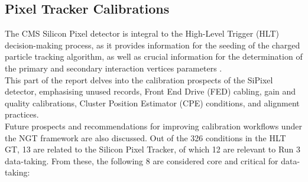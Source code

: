 \subsection{Pixel Tracker Calibrations}\label{sec:PixelCalib}

The CMS Silicon Pixel detector is integral to the High-Level Trigger (HLT) decision-making process, as it provides information for the seeding of the charged particle tracking algorithm, as well as crucial information for the determination of the primary and secondary interaction vertices parameters \cite{CMS:2012sda,CMSTrackerGroup:2020edz}.\\
This part of the report delves into the calibration prospects of the SiPixel detector, emphasising unused records, Front End Drive (FED) cabling, gain and quality calibrations, Cluster Position Estimator (CPE) conditions, and alignment practices.\\
Future prospects and recommendations for improving calibration workflows under the NGT framework are also discussed.\newline \newline 
Out of the 326 conditions in the HLT GT, 13 are related to the Silicon Pixel Tracker, of which 12 are relevant to Run 3 data-taking. From these, the following 8 are considered core and critical for data-taking:

